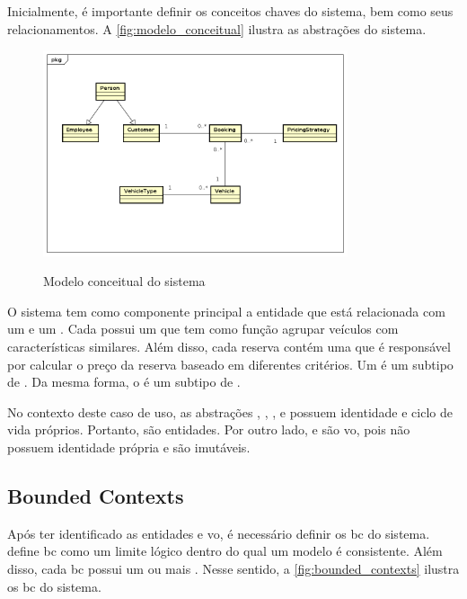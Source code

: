 Inicialmente, é importante definir os conceitos chaves do sistema, bem como seus relacionamentos. A \autoref{fig:modelo_conceitual} ilustra as abstrações do sistema.

\begin{figure}[H]
    \centering
    \caption{Modelo conceitual do sistema}
    \includegraphics[width=0.8\textwidth]{media/modelo_conceitual.png}
    \label{fig:modelo_conceitual}
\end{figure}

O sistema tem como componente principal a entidade  que está relacionada com um  e um . Cada  possui um  que tem como função agrupar veículos com características similares. Além disso, cada reserva contém uma  que é responsável por calcular o preço da reserva baseado em diferentes critérios. Um  é um subtipo de . Da mesma forma, o  é um subtipo de .

No contexto deste caso de uso, as abstrações , , ,  e  possuem identidade e ciclo de vida próprios. Portanto, são entidades. Por outro lado,  e  são \acrfull{vo}, pois não possuem identidade própria e são imutáveis. 

\subsection{Bounded Contexts}
Após ter identificado as entidades e \acrfull{vo}, é necessário definir os \acrfull{bc} do sistema.  define \acrshort{bc} como um limite lógico dentro do qual um modelo é consistente. Além disso, cada \acrshort{bc} possui um ou mais . Nesse sentido, a \autoref{fig:bounded_contexts} ilustra os \acrshort{bc} do sistema.

